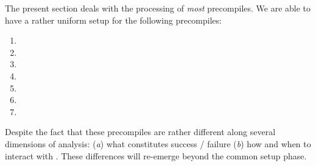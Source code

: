 The present section deals with the \hubMod{} processing of \emph{most} precompiles. We are able to have a rather uniform setup for the following precompiles:
\begin{multicols}{3}
\begin{enumerate}
    \item {}
    \item {}
    \item {}
    \item {}
    \item {}
    \item {}
    \item {}
\end{enumerate}
\end{multicols}
Despite the fact that these precompiles are rather different along several dimensions of analysis:
(\emph{a}) what constitutes success / failure
(\emph{b}) how and when to interact with .
These differences will re-emerge beyond the common setup phase.
